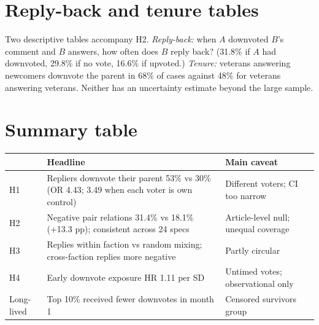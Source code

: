 \section{Reply-back and tenure tables}
Two descriptive tables accompany H2. \emph{Reply-back:} when $A$ downvoted $B$'s comment and $B$ answers, how often does $B$ reply back? (31.8\% if $A$ had downvoted, 29.8\% if no vote, 16.6\% if upvoted.) \emph{Tenure:} veterans answering newcomers downvote the parent in 68\% of cases against 48\% for veterans answering veterans. Neither has an uncertainty estimate beyond the large sample.

\section{Summary table}\label{sec:headline}
\begin{tabularx}{\textwidth}{@{}l Y l@{}}
\toprule
 & Headline & Main caveat \\
\midrule
H1 & Repliers downvote their parent 53\% vs 30\% (OR 4.43; 3.49 when each voter is own control) & Different voters; CI too narrow \\
H2 & Negative pair relations 31.4\% vs 18.1\% (+13.3 pp); consistent across 24 specs & Article-level null; unequal coverage \\
H3 & Replies within faction vs random mixing; cross-faction replies more negative & Partly circular \\
H4 & Early downvote exposure HR 1.11 per SD & Untimed votes; observational only \\
Long-lived & Top 10\% received fewer downvotes in month 1 & Censored survivors group \\
\bottomrule
\end{tabularx}
